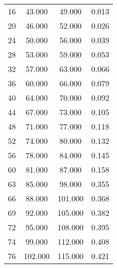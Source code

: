 % 
\begin{tabular}{cccc}
  \hline
  \hline
16 & 43.000 & 49.000 & 0.013 \\ 
  20 & 46.000 & 52.000 & 0.026 \\ 
  24 & 50.000 & 56.000 & 0.039 \\ 
  28 & 53.000 & 59.000 & 0.053 \\ 
  32 & 57.000 & 63.000 & 0.066 \\ 
  36 & 60.000 & 66.000 & 0.079 \\ 
  40 & 64.000 & 70.000 & 0.092 \\ 
  44 & 67.000 & 73.000 & 0.105 \\ 
  48 & 71.000 & 77.000 & 0.118 \\ 
  52 & 74.000 & 80.000 & 0.132 \\ 
  56 & 78.000 & 84.000 & 0.145 \\ 
  60 & 81.000 & 87.000 & 0.158 \\ 
  63 & 85.000 & 98.000 & 0.355 \\ 
  66 & 88.000 & 101.000 & 0.368 \\ 
  69 & 92.000 & 105.000 & 0.382 \\ 
  72 & 95.000 & 108.000 & 0.395 \\ 
  74 & 99.000 & 112.000 & 0.408 \\ 
  76 & 102.000 & 115.000 & 0.421 \\ 
   \hline
\end{tabular}
